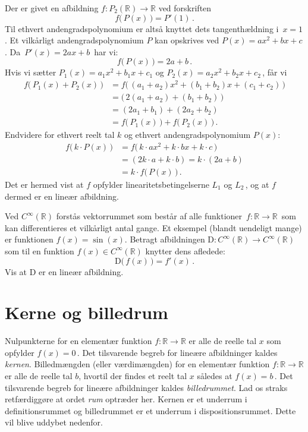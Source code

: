 \begin{example}\label{tn8.ex3Linafb}
Der er givet en afbildning $f:P_2(\mathbb R) \rightarrow \mathbb R$ ved forskriften
\begin{equation}
f\big(\,P(x)\,\big)=P'(1)\,.
\end{equation}
Til ethvert andengradspolynomium er altså knyttet dets tangenthældning i $\,x=1\,$. Et vilkårligt andengradspolynomium $P$ kan opskrives ved $P(x)=a x^2+b x+c$. Da $\,P'(x)=2ax+b\,$ har vi:
$$f\big(\,P(x)\,\big)=2a+b\,.$$
Hvis vi sætter $P_1(x)=a_1x^2+b_1x+c_1$ og
$P_2(x)=a_2 x^2+b_2 x+c_2\,$, får vi
\begin{align*}
f\big(\,P_1(x)+P_2(x)\,\big)&=
f\big(\,(a_1+a_2)x^2+(b_1+b_2)x+(c_1+c_2)\,\big)\\&=
\big(\,2(a_1+a_2)+(b_1+b_2)\,\big)\\&=(2a_1+b_1)+(2a_2+b_2)\\&=
f\big(\,P_1(x)\,\big)+f\big(\,P_2(x)\,\big)\,.
\end{align*}
Endvidere for ethvert reelt tal $k$ og ethvert andengradspolynomium $P(x)$:
\begin{align*}
f\big(\,k\cdot P(x)\,\big)&=f\big(\,k\cdot ax^2+k\cdot bx+k\cdot c\,\big)\\&=(2k\cdot a+k\cdot b)=k\cdot(2a+b)\\&=k\cdot f\big(\,P(x)\,\big)\,.
\end{align*}
Det er hermed vist at $f$ opfylder linearitetsbetingelserne $L_1$ og $L_2\,$, og at $f$ dermed er en lineær afbildning.
\end{example}

\begin{exercise}
Ved $C^{\infty}(\mathbb R)$ forstås vektorrummet som består af alle funktioner $\,f:\mathbb R\rightarrow \mathbb R\,$ som kan differentieres et vilkårligt antal gange. Et eksempel (blandt uendeligt mange) er funktionen $f(x)=\sin(x)$. Betragt afbildningen $\mathrm D:C^{\infty}(\mathbb R)\rightarrow C^{\infty}(\mathbb R)$ som til en funktion $f(x)\in C^{\infty}(\mathbb R)$ knytter dens afledede:
$$\mathrm D\big(\,f(x)\,\big)=f'(x)\,.$$
Vis at $\mathrm D$ er en lineær afbildning. 
\end{exercise}
%
\section{Kerne og billedrum}
Nulpunkterne for en elementær funktion $f:\mathbb R\rightarrow \mathbb R$ er alle de reelle tal $x$ som opfylder $f(x)=0\,$. Det tilsvarende begreb for lineære afbildninger kaldes \textit{kernen}. Billedmængden (eller værdimængden) for en elementær funktion $f:\mathbb R\rightarrow \mathbb R$ er alle de reelle tal $b$, hvortil der findes et reelt tal $x$ således at $f(x)=b\,$. Det tilsvarende begreb for lineære afbildninger kaldes \textit{billedrummet}. Lad os straks retfærdiggøre at ordet \textit{rum} optræder her. Kernen er et underrum i definitionsrummet og billedrummet er et underrum i dispositionsrummet. Dette vil blive uddybet nedenfor.

